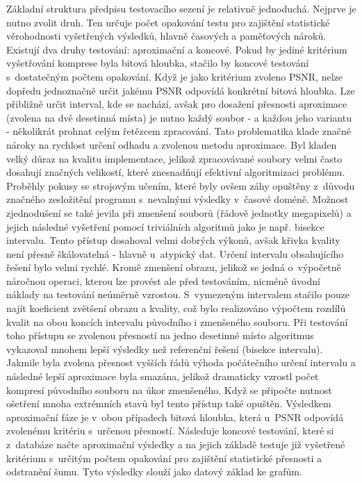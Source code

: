 Základní struktura předpisu testovacího sezení je relativně jednoduchá. Nejprve je nutno zvolit druh. Ten určuje počet opakování testu pro zajištění statistické věrohodnosti vyšetřených výsledků, hlavně časových a paměťových nároků. Existují dva druhy testování: aproximační a koncové. Pokud by jediné kritérium vyšetřování komprese byla bitová hloubka, stačilo by koncové testování s~dostatečným počtem opakování. Když je jako kritérium zvoleno PSNR, nelze dopředu jednoznačně určit jakému PSNR odpovídá konkrétní bitová hloubka. Lze přibližně určit interval, kde se nachází, avšak pro dosažení přesnosti aproximace (zvolena na dvě desetinná místa) je nutno každý soubor - a každou jeho variantu - několikrát prohnat celým řetězcem zpracování. Tato problematika klade značné nároky na rychlost určení odhadu a zvolenou metodu aproximace. Byl kladen velký důraz na kvalitu implementace, jelikož zpracovávané soubory velmi často dosahují značných velikostí, které znesnadňují efektivní algoritmizaci problému. Proběhly pokusy se strojovým učením, které byly ovšem záhy opuštěny z~důvodu značného zesložitění programu s~nevalnými výsledky v~časové doméně. Možnost zjednodušení se také jevila při zmenšení souborů (řádově jednotky megapixelů) a jejich následné vyšetření pomocí triviálních algoritmů jako je např. bisekce intervalu. Tento přístup dosahoval velmi dobrých výkonů, avšak křivka kvality není přesně škálovatelná - hlavně u~atypický dat. Určení intervalu obsahujícího řešení bylo velmi rychlé. Kromě zmenšení obrazu, jelikož se jedná o~výpočetně náročnou operaci, kterou lze provést ale před testováním, nicméně úvodní náklady na testování neúměrně vzrostou. S~vymezeným intervalem stačilo pouze najít koeficient zvětšení obrazu a kvality, což bylo realizováno výpočtem rozdílů kvalit na obou koncích intervalu původního i zmenšeného souboru. Při testování toho přístupu se zvolenou přesností na jedno desetinné místo algoritmus vykazoval mnohem lepší výsledky než referenční řešení (bisekce intervalu). Jakmile byla zvolena přesnost vyšších řádů výhoda počátečního určení intervalu a následné lepší aproximace byla smazána, jelikož dramaticky vzrostl počet kompresí původního souboru na úkor zmenšeného. Když se připočte nutnost ošetření mnoha extrémních stavů byl tento přístup také opuštěn. Výsledkem aproximační fáze je v~obou případech bitová hloubka, která u~PSNR odpovídá zvolenému kritériu s~určenou přesností. Následuje koncové testování, které si z~databáze načte aproximační výsledky a na jejich základě testuje již vyšetřené kritérium s~určitým počtem opakování pro zajištění statistické přesnosti a odstranění šumu. Tyto výsledky slouží jako datový základ ke grafům.\\
